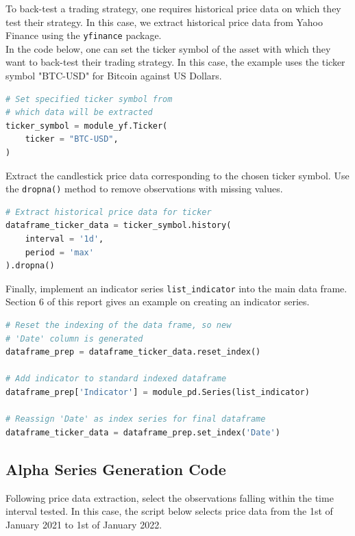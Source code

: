 \documentclass[11pt]{article}
\begin{document}
To back-test a trading strategy, one requires historical price data on which they test their strategy. In this case, we extract historical price data from Yahoo Finance using the \texttt{yfinance} package.\\

In the code below, one can set the ticker symbol of the asset with which they want to back-test their trading strategy. In this case, the example uses the ticker symbol "BTC-USD" for Bitcoin against US Dollars.

\begin{lstlisting}[language=Python]
# Set specified ticker symbol from
# which data will be extracted
ticker_symbol = module_yf.Ticker(
    ticker = "BTC-USD",
)
\end{lstlisting}

Extract the candlestick price data corresponding to the chosen ticker symbol. Use the \texttt{dropna()} method to remove observations with missing values.

\begin{lstlisting}[language=Python]
# Extract historical price data for ticker
dataframe_ticker_data = ticker_symbol.history(
    interval = '1d',
    period = 'max'
).dropna()
\end{lstlisting}

Finally, implement an indicator series \texttt{list\_indicator} into the main data frame. Section 6 of this report gives an example on creating an indicator series.

\begin{lstlisting}[language=Python]
# Reset the indexing of the data frame, so new
# 'Date' column is generated
dataframe_prep = dataframe_ticker_data.reset_index()

# Add indicator to standard indexed dataframe
dataframe_prep['Indicator'] = module_pd.Series(list_indicator)

# Reassign 'Date' as index series for final dataframe
dataframe_ticker_data = dataframe_prep.set_index('Date')
\end{lstlisting}

\subsection{Alpha Series Generation Code}

Following price data extraction, select the observations falling within the time interval tested. In this case, the script below selects price data from the 1st of January 2021 to 1st of January 2022.
\end{document}
